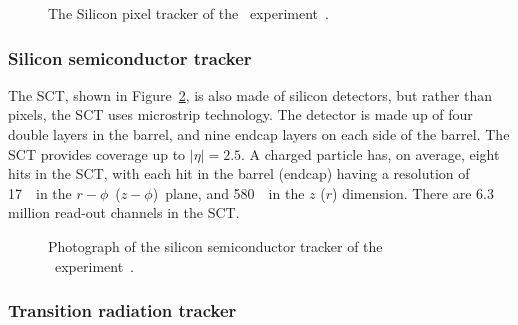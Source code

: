 \begin{figure}[th]
  \caption{
    The Silicon pixel tracker of the \atlas\ experiment~\cite{Pequenao:1095925}.
  }
  \label{fig:pixel_cartoon}
\end{figure}

\FloatBarrier
\subsubsection{Silicon semiconductor tracker} 
\label{sec:sct}

The SCT, shown in Figure~\ref{fig:sct_photo}, is also made of silicon
detectors, but rather than pixels, the SCT uses microstrip technology.
The detector is made up of four double layers in the barrel, and nine
endcap layers on each side of the barrel.
The SCT provides coverage up to $|\eta| = 2.5$.
A charged particle has, on average, eight hits in the SCT, with each hit
in the barrel (endcap) having a resolution of 17~\um\ in the
$r-\phi$~($z-\phi$)~plane, and 580~\um\ in the $z$ ($r$) dimension.
There are 6.3 million read-out channels in the SCT.

\begin{figure}[th]
  \caption{
    Photograph of the silicon semiconductor tracker of the
    \atlas\ experiment~\cite{Maximilien:883305}.
  }
  \label{fig:sct_photo}
\end{figure}

\subsubsection{Transition radiation tracker} 
\label{sec:trt}

